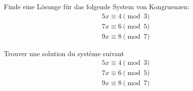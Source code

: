 Finde eine Lösunge für das folgende System von Kongruenzen:
\begin{align*}
5x \equiv 4 \pmod{3}\\
7x \equiv 6 \pmod{5}\\
9x \equiv 8 \pmod{7}
\end{align*}

\bigskip

Trouver une solution du système suivant
\begin{align*}
5x \equiv 4 \pmod{3}\\
7x \equiv 6 \pmod{5}\\
9x \equiv 8 \pmod{7}
\end{align*}
